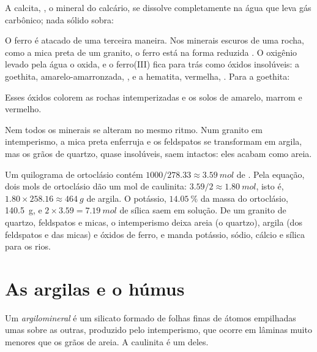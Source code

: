 \begin{proposition}\label{prop:g10:soil-formation:calcite}
A calcita, , o mineral do calcário, se dissolve completamente na
água que leva gás carbônico; nada sólido sobra:
\begin{center}
\end{center}
\end{proposition}

O ferro é atacado de uma terceira maneira. Nos minerais escuros de uma rocha,
como a mica preta de um granito, o ferro está na forma reduzida .
O oxigênio levado pela água o oxida, e o ferro(III) fica para trás como
óxidos insolúveis: a goethita, amarelo-amarronzada, , e a
hematita, vermelha, . Para a goethita:
\begin{center}
\end{center}
Esses óxidos colorem as rochas intemperizadas e os solos de amarelo, marrom
e vermelho.

Nem todos os minerais se alteram no mesmo ritmo. Num granito em
intemperismo, a mica preta enferruja e os feldspatos se transformam em
argila, mas os grãos de quartzo, quase insolúveis, saem intactos: eles
acabam como areia.

\begin{example}\label{ex:g10:soil-formation:granite}
Um quilograma de ortoclásio contém $1000/278.33 \approx \qty{3.59}{mol}$ de
. Pela equação, dois mols de ortoclásio dão um mol de
caulinita: $3.59/2 \approx \qty{1.80}{mol}$, isto é, $1.80 \times 258.16
\approx \qty{464}{g}$ de argila. O potássio, $14.05~\%$ da massa do
ortoclásio, \qty{140.5}{g}, e $2 \times 3.59 = \qty{7.19}{mol}$ de sílica
saem em solução. De um granito de quartzo, feldspatos e micas, o
intemperismo deixa areia (o quartzo), argila (dos feldspatos e das micas) e
óxidos de ferro, e manda potássio, sódio, cálcio e sílica para os rios.
\end{example}

\section{As argilas e o húmus}

\begin{definition}[Argilomineral]\label{def:g10:soil-formation:clay}
Um \emph{argilomineral} é um silicato formado de folhas
finas de átomos empilhadas umas sobre as outras, produzido pelo
intemperismo, que ocorre em lâminas muito menores que os grãos de areia. A
caulinita é um deles.
\end{definition}

